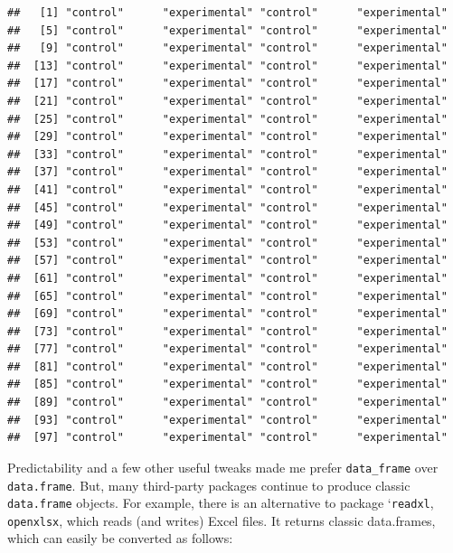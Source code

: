 \documentclass[]{svmono}
\newenvironment{Shaded}{\begin{snugshade}}{\end{snugshade}}
\newcommand{\KeywordTok}[1]{\textcolor[rgb]{0.13,0.29,0.53}{\textbf{#1}}}
\newcommand{\StringTok}[1]{\textcolor[rgb]{0.31,0.60,0.02}{#1}}
\newcommand{\OperatorTok}[1]{\textcolor[rgb]{0.81,0.36,0.00}{\textbf{#1}}}
\newcommand{\NormalTok}[1]{#1}
\theoremstyle{definition}
\theoremstyle{definition}
\theoremstyle{definition}
\theoremstyle{remark}
\begin{document}
\begin{verbatim}
##   [1] "control"      "experimental" "control"      "experimental"
##   [5] "control"      "experimental" "control"      "experimental"
##   [9] "control"      "experimental" "control"      "experimental"
##  [13] "control"      "experimental" "control"      "experimental"
##  [17] "control"      "experimental" "control"      "experimental"
##  [21] "control"      "experimental" "control"      "experimental"
##  [25] "control"      "experimental" "control"      "experimental"
##  [29] "control"      "experimental" "control"      "experimental"
##  [33] "control"      "experimental" "control"      "experimental"
##  [37] "control"      "experimental" "control"      "experimental"
##  [41] "control"      "experimental" "control"      "experimental"
##  [45] "control"      "experimental" "control"      "experimental"
##  [49] "control"      "experimental" "control"      "experimental"
##  [53] "control"      "experimental" "control"      "experimental"
##  [57] "control"      "experimental" "control"      "experimental"
##  [61] "control"      "experimental" "control"      "experimental"
##  [65] "control"      "experimental" "control"      "experimental"
##  [69] "control"      "experimental" "control"      "experimental"
##  [73] "control"      "experimental" "control"      "experimental"
##  [77] "control"      "experimental" "control"      "experimental"
##  [81] "control"      "experimental" "control"      "experimental"
##  [85] "control"      "experimental" "control"      "experimental"
##  [89] "control"      "experimental" "control"      "experimental"
##  [93] "control"      "experimental" "control"      "experimental"
##  [97] "control"      "experimental" "control"      "experimental"
\end{verbatim}

Predictability and a few other useful tweaks made me prefer
\texttt{data\_frame} over \texttt{data.frame}. But, many third-party
packages continue to produce classic \texttt{data.frame} objects. For
example, there is an alternative to package `\texttt{readxl},
\texttt{openxlsx}, which reads (and writes) Excel files. It returns
classic data.frames, which can easily be converted as follows:

\begin{Shaded}
\end{Shaded}
\end{document}
